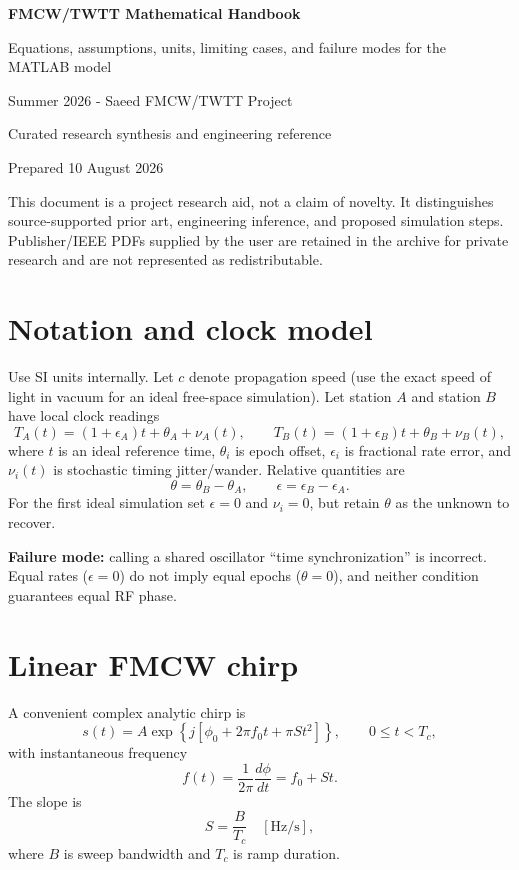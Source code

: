 \documentclass[11pt]{article}
\begin{document}
\begin{titlepage}
\centering
\vspace*{1.2in}
{\Huge\bfseries\color{navy} FMCW/TWTT Mathematical Handbook\par}
\vspace{0.3in}
{\Large Equations, assumptions, units, limiting cases, and failure modes for the MATLAB model\par}
\vspace{0.6in}
{\large Summer 2026 - Saeed FMCW/TWTT Project\par}
\vfill
{\large Curated research synthesis and engineering reference\par}
{\large Prepared 10 August 2026\par}
\vspace{0.4in}
\begin{minipage}{0.82\textwidth}
\small
This document is a project research aid, not a claim of novelty. It distinguishes source-supported prior art, engineering inference, and proposed simulation steps. Publisher/IEEE PDFs supplied by the user are retained in the archive for private research and are not represented as redistributable.
\end{minipage}
\end{titlepage}
\tableofcontents
\clearpage

\section{Notation and clock model}
Use SI units internally. Let $c$ denote propagation speed (use the exact speed of light in vacuum for an ideal free-space simulation). Let station $A$ and station $B$ have local clock readings
\[
T_A(t)=(1+\epsilon_A)t+\theta_A+\nu_A(t),\qquad
T_B(t)=(1+\epsilon_B)t+\theta_B+\nu_B(t),
\]
where $t$ is an ideal reference time, $\theta_i$ is epoch offset, $\epsilon_i$ is fractional rate error, and $\nu_i(t)$ is stochastic timing jitter/wander. Relative quantities are
\[
\theta=\theta_B-\theta_A,\qquad \epsilon=\epsilon_B-\epsilon_A.
\]
For the first ideal simulation set $\epsilon=0$ and $\nu_i=0$, but retain $\theta$ as the unknown to recover.

\textbf{Failure mode:} calling a shared oscillator ``time synchronization'' is incorrect. Equal rates ($\epsilon=0$) do not imply equal epochs ($\theta=0$), and neither condition guarantees equal RF phase.

\section{Linear FMCW chirp}
A convenient complex analytic chirp is
\[
s(t)=A\exp\left\{j\left[\phi_0+2\pi f_0t+\pi St^2\right]\right\},\qquad 0\le t<T_c,
\]
with instantaneous frequency
\[
f(t)=\frac{1}{2\pi}\frac{d\phi}{dt}=f_0+St.
\]
The slope is
\[
S=\frac{B}{T_c}\quad [\mathrm{Hz/s}],
\]
where $B$ is sweep bandwidth and $T_c$ is ramp duration.
\end{document}
